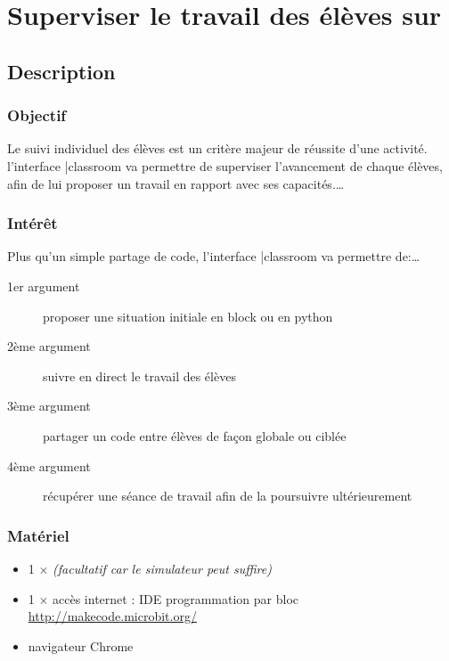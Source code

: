 

\section{Superviser le travail des élèves sur \mb}




\subsection{Description}

\subsubsection{Objectif}


\begin{formule}
Le suivi individuel des élèves est un critère majeur de réussite d'une activité. 
l'interface \mb |classroom va permettre de superviser l'avancement de chaque élèves, 
afin de lui proposer un travail en rapport avec ses capacités.\ldots
\end{formule}


\subsubsection{Intérêt}

Plus qu'un simple partage de code, l'interface \mb |classroom va permettre de:\ldots

\begin{description}
    \item [1er argument] proposer une situation initiale en block ou en python
    \item [2ème argument] suivre en direct le travail des élèves
    \item [3ème argument] partager un code entre élèves de façon globale ou ciblée
    \item [4ème argument] récupérer une séance de travail afin de la poursuivre ultérieurement
\end{description}


\subsubsection{Matériel}
\begin{itemize}
    \item 1 $\times$ \matosMb \emph{(facultatif car le simulateur peut suffire)}
    \item 1 $\times$ accès internet : IDE programmation par bloc \url{http://makecode.microbit.org/}
    \item navigateur Chrome
\end{itemize}



